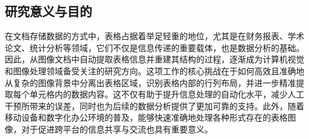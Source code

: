 \documentclass[../article.tex]{subfiles} %
\begin{document}
\subsection{研究意义与目的}

在文档存储数据的方式中，表格占据着举足轻重的地位，尤其是在财务报表、学术论文、统计分析等领域，它们不仅是信息传递的重要载体，也是数据分析的基础。因此，从图像文档中自动提取表格信息并重建其结构的过程，逐渐成为计算机视觉和图像处理领域备受关注的研究方向。这项工作的核心挑战在于如何高效且准确地从复杂的图像背景中分离出表格区域，识别表格内部的行列布局，并进一步精准提取每个单元格内的数据内容。这不仅有助于提升信息处理的自动化水平，减少人工干预所带来的误差，同时也为后续的数据分析提供了更加可靠的支持。此外，随着移动设备和数字化办公环境的普及，能够快速准确地处理各种形式存在的表格图像，对于促进跨平台的信息共享与交流也具有重要意义。
\end{document}
